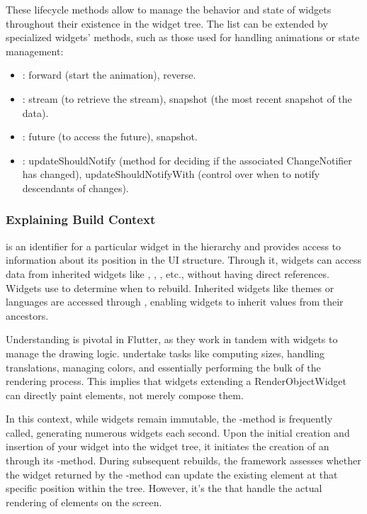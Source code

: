 \noindent These lifecycle methods allow to manage the behavior and state of widgets throughout their existence in the 
widget tree. The list can be extended by specialized widgets' methods, such as those used for handling animations or 
state management: 

\begin{itemize}
  \item {}: forward (start the animation), reverse.
  \item {}: stream (to retrieve the stream), snapshot (the most recent snapshot of the data).
  \item {}: future (to access the future), snapshot.
  \item {}: updateShouldNotify (method for deciding if the associated ChangeNotifier has 
  changed), updateShouldNotifyWith (control over when to notify descendants of changes).
\end{itemize}


\newpage
\subsubsection{Explaining Build Context}

 is an identifier for a particular widget in the hierarchy and provides access to information about its 
position in the UI structure. Through it, widgets can access data from inherited widgets like , , 
, etc., without having direct references. Widgets use  to determine when to rebuild. 
Inherited widgets like themes or languages are accessed through , enabling widgets to inherit values 
from their ancestors.

Understanding  is pivotal in Flutter, as they work in tandem with widgets to manage the drawing logic.
 undertake tasks like computing sizes, handling translations, managing colors, and essentially 
performing the bulk of the rendering process. This implies that widgets extending a RenderObjectWidget can directly 
paint elements, not merely compose them.

In this context, while widgets remain immutable, the -method is frequently called, generating numerous widgets 
each second. Upon the initial creation and insertion of your widget into the widget tree, it initiates the creation of 
an  through its -method. During subsequent rebuilds, the framework assesses whether the 
widget returned by the -method can update the existing element at that specific position within the tree. 
However, it's the  that handle the actual rendering of elements on the screen.

